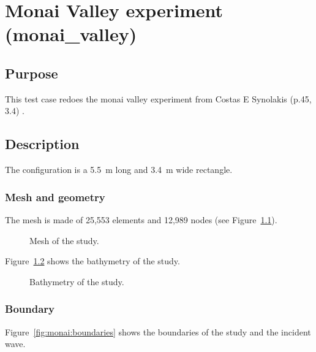 \chapter{Monai Valley experiment (monai\_valley)}

\section{Purpose}

This test case redoes the monai valley experiment from Costas E Synolakis
(p.45, 3.4) \cite{Costas2007}.

\section{Description}

The configuration is a 5.5~m long and 3.4~m wide rectangle.

\subsection{Mesh and geometry}

The mesh is made of 25,553 elements and 12,989 nodes
(see Figure~\ref{fig:monai:mesh}).

\begin{figure}[H]
\centering
{}
\caption{Mesh of the study.}
\label{fig:monai:mesh}
\end{figure}

Figure~\ref{fig:monai:bathy} shows the bathymetry of the study.

\begin{figure}[H]
\centering
{}
\caption{Bathymetry of the study.}
\label{fig:monai:bathy}
\end{figure}

\subsection{Boundary}

Figure~\ref{fig:monai:boundaries} shows the boundaries of the study and the
incident wave.

